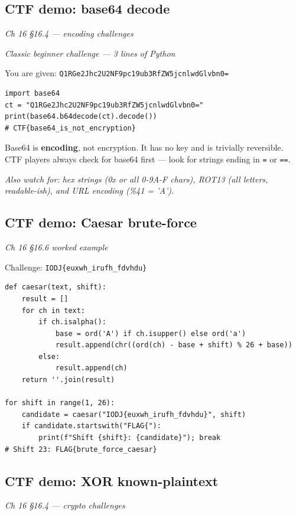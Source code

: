 \documentclass[12pt,openany]{book}
\begin{document}
\medskip

\subsection*{CTF demo: base64 decode}
{\small\itshape\color{gray}Ch 16 §16.4 --- encoding challenges}

{\small\itshape\color{gray}Classic beginner challenge --- 3 lines of Python}

You are given: \texttt{Q1RGe2Jhc2U2NF9pc19ub3RfZW5jcnlwdGlvbn0=}


\begin{lstlisting}
import base64
ct = "Q1RGe2Jhc2U2NF9pc19ub3RfZW5jcnlwdGlvbn0="
print(base64.b64decode(ct).decode())
# CTF{base64_is_not_encryption}\end{lstlisting}


Base64 is \textbf{encoding}, not encryption. It has no key and is trivially reversible. CTF players always check for base64 first --- look for strings ending in \texttt{=} or \texttt{==}.

{\small\itshape\color{gray}Also watch for: hex strings (0x or all 0-9A-F chars), ROT13 (all letters, readable-ish), and URL encoding (\%41 = 'A').}

\medskip

\subsection*{CTF demo: Caesar brute-force}
{\small\itshape\color{gray}Ch 16 §16.6 worked example}

Challenge: \texttt{IODJ\{euxwh\_irufh\_fdvhdu\}}


\begin{lstlisting}
def caesar(text, shift):
    result = []
    for ch in text:
        if ch.isalpha():
            base = ord('A') if ch.isupper() else ord('a')
            result.append(chr((ord(ch) - base + shift) % 26 + base))
        else:
            result.append(ch)
    return ''.join(result)

for shift in range(1, 26):
    candidate = caesar("IODJ{euxwh_irufh_fdvhdu}", shift)
    if candidate.startswith("FLAG{"):
        print(f"Shift {shift}: {candidate}"); break
# Shift 23: FLAG{brute_force_caesar}\end{lstlisting}

\medskip

\subsection*{CTF demo: XOR known-plaintext}
{\small\itshape\color{gray}Ch 16 §16.4 --- crypto challenges}
\end{document}
